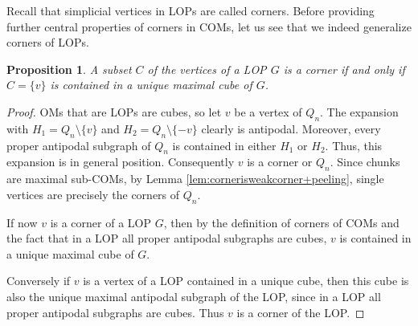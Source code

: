 \documentclass[final,11pt]{article}
\newtheorem{prop}[thm]{Proposition}%
\newcommand{\comment}[1]{\textcolor{red}{#1}}
\begin{document}
Recall that simplicial vertices in LOPs are called corners.
Before providing further central properties of corners in COMs, let us see that we indeed generalize corners of LOPs.

\begin{prop}\label{prop:cornersofLOPs}
 A subset $C$ of the vertices of a LOP $G$ is a corner if and only if $C=\{v\}$ is contained in a unique maximal cube of $G$.%
\end{prop}
\begin{proof}
OMs that are LOPs are cubes, so let $v$ be a vertex of ${Q}_n$. The expansion with $H_1={Q}_n\setminus\{v\}$ and $H_2={Q}_n\setminus\{-v\}$ clearly is antipodal. Moreover, every proper antipodal subgraph of ${Q}_n$ is contained in either $H_1$ or $H_2$. Thus, this expansion is in general position. Consequently $v$ is a corner or ${Q}_n$. Since chunks are maximal sub-COMs, by Lemma \ref{lem:cornerisweakcorner+peeling}, single vertices are precisely the corners of ${Q}_n$. 

If now $v$ is a corner of a LOP $G$, then by the definition of corners of COMs and the fact that in a LOP all proper antipodal subgraphs are cubes, $v$ is contained in a unique maximal cube of $G$.

Conversely if $v$ is a vertex of a LOP contained in a unique cube, then this cube is also the unique maximal antipodal subgraph of the LOP, since in a LOP all proper antipodal subgraphs are cubes. Thus $v$ is a corner of the LOP.
\end{proof}
\end{document}
